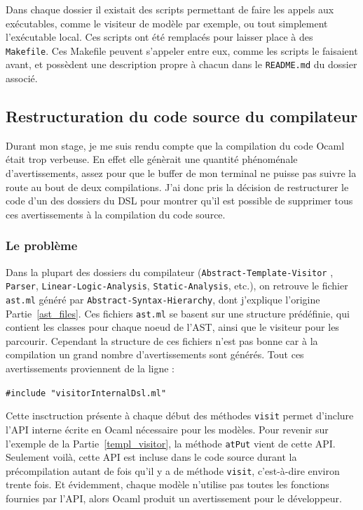 Dans chaque dossier il existait des scripts permettant de faire les appels aux 
exécutables, comme le visiteur de modèle par exemple, ou tout simplement 
l'exécutable local. Ces scripts ont été remplacés pour laisser place à des 
\texttt{Makefile}. Ces Makefile peuvent s'appeler entre eux, comme les scripts 
le faisaient avant, et possèdent une description propre à chacun dans le \texttt
{README.md} du dossier associé.

\subsection{Restructuration du code source du compilateur} 
\label{warnings}

Durant mon stage, je me suis rendu compte que la compilation du code Ocaml 
était trop verbeuse. En effet elle génèrait une quantité phénoménale 
d'avertissements, assez pour que le buffer de mon terminal ne puisse pas suivre 
la route au bout de deux compilations. J'ai donc pris la décision de 
restructurer le code d'un des dossiers du DSL pour montrer qu'il est possible 
de supprimer tous ces avertissements à la compilation du code source.

\subsubsection{Le problème}

Dans la plupart des dossiers du compilateur (\texttt{Abstract-Template-Visitor}
, \texttt{Parser}, \texttt{Linear-Logic-Analysis}, \texttt{Static-Analysis}, 
etc.), on retrouve le fichier \texttt{ast.ml} généré par \texttt
{Abstract-Syntax-Hierarchy}, dont j'explique l'origine Partie~\ref{ast_files}. 
Ces fichiers \texttt{ast.ml} se basent sur une structure prédéfinie, qui 
contient les classes pour chaque noeud de l'AST, ainsi que le visiteur pour les 
parcourir. Cependant la structure de ces fichiers n'est pas bonne car à la 
compilation un grand nombre d'avertissements sont générés. Tout ces 
avertissements proviennent de la ligne :

\vspace{3mm}
\texttt{\#include "visitorInternalDsl.ml"}
\vspace{3mm}

Cette insctruction présente à chaque début des méthodes \texttt{visit} permet 
d'inclure l'API interne écrite en Ocaml nécessaire pour les modèles. Pour 
revenir sur l'exemple de la Partie~\ref{templ_visitor}, la méthode \texttt
{atPut} vient de cette API. Seulement voilà, cette API est incluse dans le code 
source durant la précompilation autant de fois qu'il y a de méthode \texttt
{visit}, c'est-à-dire environ trente fois. Et évidemment, chaque modèle 
n'utilise pas toutes les fonctions fournies par l'API, alors Ocaml produit un 
avertissement pour le développeur.

